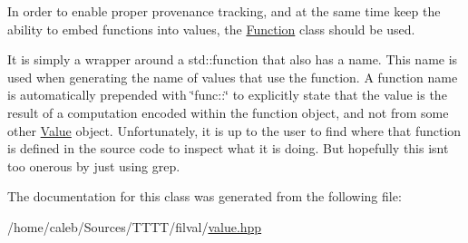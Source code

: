 In order to enable proper provenance tracking, and at the same time keep the ability to embed functions into values, the \hyperlink{classfv_1_1Function}{Function} class should be used. 

It is simply a wrapper around a std\+::function that also has a name. This name is used when generating the name of values that use the function. A function name is automatically prepended with \char`\"{}func\+::\char`\"{} to explicitly state that the value is the result of a computation encoded within the function object, and not from some other \hyperlink{classfv_1_1Value}{Value} object. Unfortunately, it is up to the user to find where that function is defined in the source code to inspect what it is doing. But hopefully this isn\textquotesingle{}t too onerous by just using grep. 

The documentation for this class was generated from the following file\+:\begin{DoxyCompactItemize}
\item 
/home/caleb/\+Sources/\+T\+T\+T\+T/filval/\hyperlink{value_8hpp}{value.\+hpp}\end{DoxyCompactItemize}
